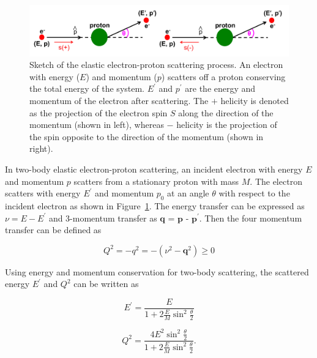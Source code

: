 \begin{singlespace}
\begin{figure}[!h]
	\begin{center}
	\includegraphics[width=15.0cm]{figures/e+p_scattering}
	\end{center}
	\caption
	{Sketch of the elastic electron-proton scattering process. An electron with energy ($E$) and momentum ($p$) scatters off a proton conserving the total energy of the system. $E^{\prime}$ and $p^{\prime}$ are the energy and momentum of the electron after scattering. The $+$ helicity is denoted as the projection of the electron spin $S$ along the direction of the momentum (shown in left), whereas $-$ helicity is the projection of the spin opposite to the direction of the momentum (shown in right).}
	\label{fig:e-p_scattering}
\end{figure}
\end{singlespace}

In two-body elastic electron-proton scattering, an incident electron with energy $E$ and momentum $p$ scatters from a stationary proton with mass $M$. The electron scatters with energy $E^{\prime}$ and momentum $p_{0}$ at an angle $\theta$ with respect to the incident electron as shown in Figure~\ref{fig:e-p_scattering}. The energy transfer can be expressed as $\nu = E - E^{\prime}$ and 3-momentum transfer as $\textbf{q}$ = $\textbf{p}$ - $\textbf{p}^{\prime}$. Then the four momentum transfer can be defined as 

\begin{equation} \label{equ:kinQ2_1}
Q^{2} = -q^{2} = -(\nu^{2} - \textbf{q}^{2}) \geq 0
\end{equation}

Using energy and momentum conservation for two-body scattering, the scattered energy $E^{\prime}$ and $Q^{2}$ can be written as

\begin{equation} \label{equ:kinEprime}
E^{\prime} = \frac{E}{ 1 + 2\frac{E}{M}\sin^{2} \frac{\theta}{2} }
\end{equation}

\begin{equation} \label{equ:kinQ2}
Q^{2} = \frac{4E^{2}\sin^{2}\frac{\theta}{2}}{ 1 + 2\frac{E}{M}\sin^{2}\frac{\theta}{2} }.
\end{equation}

